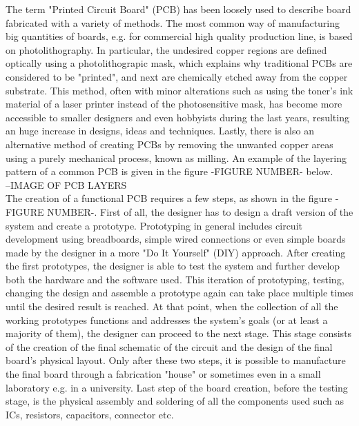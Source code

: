The term "Printed Circuit Board" (PCB) has been loosely used to describe board fabricated with a variety of methods. \cite{TorontoUNI_GuideToPCB} The most common way of manufacturing big quantities of boards, e.g. for commercial high quality production line, is based on photolithography. In particular, the undesired copper regions are defined optically using a photolithograpic mask, which explains why traditional PCBs are considered to be "printed", and next are chemically etched away from the copper substrate. This method, often with minor alterations such as using the toner's ink material of a laser printer instead of the photosensitive mask, has become more accessible to smaller designers and even hobbyists during the last years, resulting an huge increase in designs, ideas and techniques. Lastly, there is also an alternative method of creating PCBs by removing the unwanted copper areas using a purely mechanical process, known as milling. An example of the layering pattern of a common PCB is given in the figure -FIGURE NUMBER- below.\\

--IMAGE OF PCB LAYERS\\

The creation of a functional PCB requires a few steps, as shown in the figure -FIGURE NUMBER-. First of all, the designer has to design a draft version of the system and create a prototype. Prototyping in general includes circuit development using breadboards, simple wired connections or even simple boards made by the designer in a more "Do It Yourself" (DIY) approach. After creating the first prototypes, the designer is able to test the system and further develop both the hardware and the software used. This iteration of prototyping, testing, changing the design and assemble a prototype again can take place multiple times until the desired result is reached. At that point, when the collection of all the working prototypes functions and addresses the system's goals (or at least a majority of them), the designer can proceed to the next stage. This stage consists of the creation of the final schematic of the circuit and the design of the final board's physical layout. Only after these two steps, it is possible to manufacture the final board through a fabrication "house" or sometimes even in a small laboratory e.g. in a university. Last step of the board creation, before the testing stage, is the physical assembly and soldering of all the components used such as ICs, resistors, capacitors, connector etc.\\

